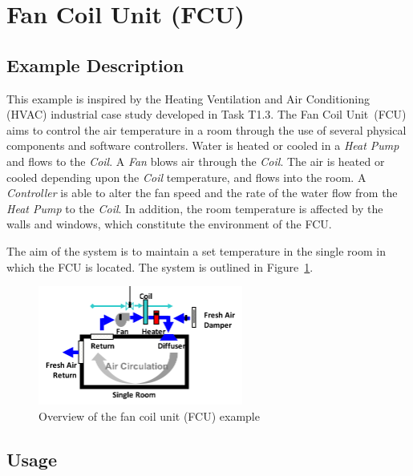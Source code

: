 \section{Fan Coil Unit (FCU)}
\label{sec:fcu}

\subsection{Example Description}

This example is inspired by the Heating Ventilation and Air Conditioning (HVAC) industrial case study developed in Task T1.3. The Fan Coil Unit~(FCU) aims to control the  air temperature in a room through the use of several physical components and software controllers. Water is heated or cooled in a \emph{Heat Pump} and flows to the \emph{Coil}. A \emph{Fan} blows air through the \emph{Coil}. The air is heated or cooled depending upon the \emph{Coil} temperature, and flows into the room. A \emph{Controller} is able to alter the fan speed and the rate of the water flow from the \emph{Heat Pump} to the \emph{Coil}.  In addition, the room temperature is affected by the walls and windows, which constitute the environment of the FCU.

The aim of the system is to maintain a set temperature in the single room in which the FCU is located. The system is outlined in Figure~\ref{fig:fcuoverview}.

\begin{figure}[htbp]
\begin{center}
\includegraphics[width=0.6\textwidth]{fcu/fcu_overview}
\caption{Overview of the fan coil unit (FCU) example}
\label{fig:fcuoverview}
\end{center}
\end{figure}

\subsection{Usage}
\label{sec:fcu_usage}


